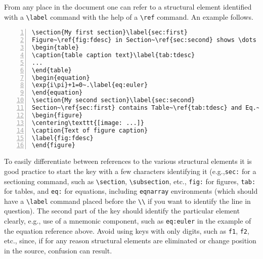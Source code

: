 \documentclass{cernphprep}
\makeatletter
\providecommand*\eg{e.g.,\xspace}
\providecommand*\etc{etc.\@\xspace}
\makeatother
\begin{document}
From any place in the document one can refer to a structural element
identified with a \verb!\label! command with the help of a \verb!\ref!
command. An example follows.
\begin{Verbatim}[numbers=left,fontsize=\small]
\section{My first section}\label{sec:first}
Figure~\ref{fig:fdesc} in Section~\ref{sec:second} shows \dots
\begin{table}
\caption{table caption text}\label{tab:tdesc}
...
\end{table}
\begin{equation}
\exp{i\pi}+1=0~.\label{eq:euler}
\end{equation}
\section{My second section}\label{sec:second}
Section~\ref{sec:first} contains Table~\ref{tab:tdesc} and Eq.~\ref{eq:euler}...
\begin{figure}
\centering\texttt{[image: ...]}
\caption{Text of figure caption}
\label{fig:fdesc}
\end{figure}
\end{Verbatim}
To easily differentiate between references to the various structural
elements it is good practice to start the key with a few characters
identifying it (\eg \texttt{sec:} for a sectioning command, such as
\verb!\section!, \verb!\subsection!, \etc, \texttt{fig:} for figures,
\texttt{tab:} for tables, and \texttt{eq:} for equations, including
\texttt{eqnarray} environments (which should have a \verb!\label!
command placed before the \verb!\\! if you want to identify the line
in question). The second part of the key should identify the
particular element clearly, \eg use of a mnemonic component, such as
\texttt{eq:euler} in the example of the equation reference
above. Avoid using keys with only digits, such as \texttt{f1},
\texttt{f2}, \etc, since, if for any reason structural elements are
eliminated or change position in the source, confusion can result.
\end{document}
